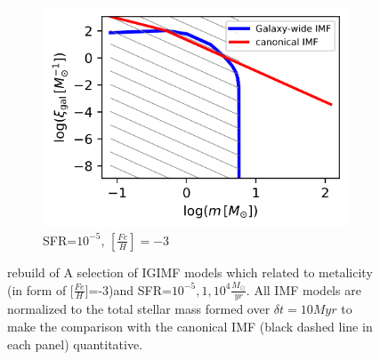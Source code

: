\begin{figure}
	\begin{subfigure}[b]{0.45\textwidth}
		\includegraphics[width=\textwidth]{sfr1e-5-feh-3.png}
		\caption{SFR=$10^{-5}$, $[\frac{Fe}{H}]=-3$}
		\label{fig:2d-5dt}
	\end{subfigure}
	\caption{rebuild of A selection of IGIMF models which related to metalicity (in form of $[\frac{Fe}{H}$]=-3)and SFR=$10^{-5},1,10^{4} \frac{M_{\odot}}{yr}$. All IMF models are
		normalized to the total stellar mass formed over $\delta t = 10 Myr$ to make the comparison with the canonical IMF (black dashed line in each panel)
		quantitative.}
	\label{fig:feh-3}
\end{figure}

